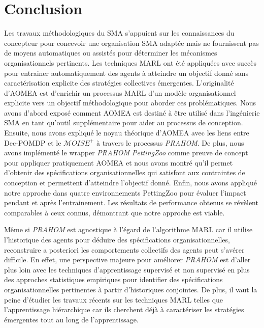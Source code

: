 \documentclass[contribution]{jfsma}
\begin{document}
\section{Conclusion}

Les travaux méthodologiques du SMA s'appuient sur les connaissances du concepteur pour concevoir une organisation SMA adaptée mais ne fournissent pas de moyens automatiques ou assistés pour déterminer les mécanismes organisationnels pertinents.
Les techniques MARL ont été appliquées avec succès pour entrainer automatiquement des agents à atteindre un objectif donné sans caractérisation explicite des stratégies collectives émergentes.
L'originalité d'AOMEA est d'enrichir un processus MARL d'un modèle organisationnel explicite vers un objectif méthodologique pour aborder ces problématiques. Nous avons d'abord exposé comment AOMEA est destiné à être utilisé dans l'ingénierie SMA en tant qu'outil supplémentaire pour aider au processus de conception.
Ensuite, nous avons expliqué le noyau théorique d'AOMEA avec les liens entre Dec-POMDP et le $\mathcal{M}OISE^+$ à travers le processus \emph{PRAHOM}.
De plus, nous avons implémenté le wrapper \emph{PRAHOM PettingZoo} comme preuve de concept pour appliquer pratiquement AOMEA et nous avons montré qu'il permet d'obtenir des spécifications organisationnelles qui satisfont aux contraintes de conception et permettent d'atteindre l'objectif donné.
Enfin, nous avons appliqué notre approche dans quatre environnements PettingZoo pour évaluer l'impact pendant et après l'entrainement. Les résultats de performance obtenus se révèlent comparables à ceux connus, démontrant que notre approche est viable.

Même si \emph{PRAHOM} est agnostique à l'égard de l'algorithme MARL car il utilise l'historique des agents pour déduire des spécifications organisationnelles, reconstruire a posteriori les comportements collectifs des agents peut s'avérer difficile. En effet, une perspective majeure pour améliorer \emph{PRAHOM} est d'aller plus loin avec les techniques d'apprentissage supervisé et non supervisé en plus des approches statistiques empiriques pour identifier des spécifications organisationnelles pertinentes à partir d'historiques conjointes. De plus, il vaut la peine d’étudier les travaux récents sur les techniques MARL telles que l’apprentissage hiérarchique car ils cherchent déjà à caractériser les stratégies émergentes tout au long de l’apprentissage.






\end{document}
